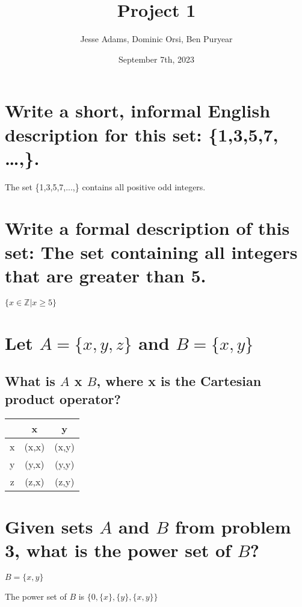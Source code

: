 \documentclass{article}
\title{Project 1}
\author{Jesse Adams, Dominic Orsi, Ben Puryear}
\date{September 7th, 2023}
\begin{document}
\maketitle

\section{Write a short, informal English description for this set: \{1,3,5,7, …,\}.}
\begin{center}
	The set \{1,3,5,7,...,\} contains all positive odd integers.
\end{center}

\section{Write a formal description of this set: The set containing all integers that are greater than 5.}
\begin{center}
	$\{x \in \mathbb{Z} | x \ge 5 \}$
\end{center}

\section{Let $A = \{x,y,z\}$ and $B = \{x,y\}$}
\subsection{What is $A$ x $B$, where x is the Cartesian product operator?}
\begin{center}
	\begin{tabular}{ |c|c|c| }
		  & x     & y     \\
		\hline
		x & (x,x) & (x,y) \\
		y & (y,x) & (y,y) \\
		z & (z,x) & (z,y) \\
	\end{tabular}
\end{center}

\section{Given sets $A$ and $B$ from problem 3, what is the power set of $B$?}
$B = \{x,y\}$
\begin{center}
	The power set of $B$ is $\{0, \{x\},\{y\}, \{x,y\}\}$
\end{center}
\end{document}
